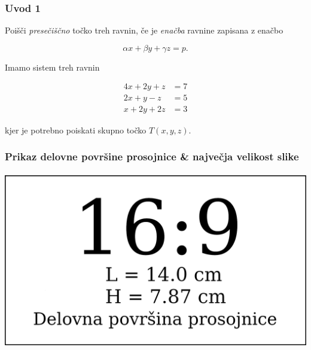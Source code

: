 \documentclass[8pt,aspectratio=169]{beamer} %
\begin{document}

\begin{frame}
	\frametitle{Uvod 1}
	
	 Poišči \emph{presečiščno} točko treh ravnin, če je \emph{enačba} ravnine zapisana z enačbo
	
	\[
	\alpha x + \beta y + \gamma z = p.
	\]
	
	 Imamo sistem treh ravnin
	
	\begin{equation} \label{eq:plane_system}
		\begin{split}
			4 x + 2 y + z & = 7\\
			2 x + y - z & = 5\\
			x + 2 y + 2 z & = 3
		\end{split}	
	\end{equation}
	
	kjer je potrebno poiskati skupno točko $T(x,y,z)$.
	
\end{frame}


\begin{frame}
	\frametitle{Prikaz delovne površine prosojnice \& največja velikost slike}
	
	
	\begin{center}
		\includegraphics[height=7.7cm]{figs/169_frame.png} %
	\end{center}	
	
\end{frame}
\end{document}
